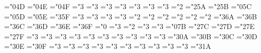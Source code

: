 \mathchardef\vartriangle="0\msx@4D
\mathchardef\blacktriangle="0\msx@4E
\mathchardef\triangledown="0\msx@4F
\mathchardef\eqcirc="3
\mathchardef\lesseqgtr="3
\mathchardef\gtreqless="3
\mathchardef\lesseqqgtr="3
\mathchardef\gtreqqless="3
\mathchardef\Rrightarrow="3
\mathchardef\Lleftarrow="3
\mathchardef\veebar="2
\mathchardef\barwedge="2\msx@5A
\mathchardef\doublebarwedge="2\msx@5B
\mathchardef\angle="0\msx@5C
\mathchardef\measuredangle="0\msx@5D
\mathchardef\sphericalangle="0\msx@5E
\mathchardef\varpropto="3\msx@5F
\mathchardef\smallsmile="3
\mathchardef\smallfrown="3
\mathchardef\Subset="3
\mathchardef\Supset="3
\mathchardef\Cup="2
\let\doublecup=\Cup
\mathchardef\Cap="2
\let\doublecap=\Cap
\mathchardef\curlywedge="2
\mathchardef\curlyvee="2
\mathchardef\leftthreetimes="2
\mathchardef\rightthreetimes="2
\mathchardef\subseteqq="3\msx@6A
\mathchardef\supseteqq="3\msx@6B
\mathchardef\bumpeq="3\msx@6C
\mathchardef\Bumpeq="3\msx@6D
\mathchardef\lll="3\msx@6E
\let\llless=\lll
\mathchardef\ggg="3\msx@6F
\let\gggtr=\ggg
\mathchardef\circledS="0
\mathchardef\pitchfork="3
\mathchardef\dotplus="2
\mathchardef\backsim="3
\mathchardef\backsimeq="3
\mathchardef\complement="0\msx@7B
\mathchardef\intercal="2\msx@7C
\mathchardef\circledcirc="2\msx@7D
\mathchardef\circledast="2\msx@7E
\mathchardef\circleddash="2\msx@7F
\def\ulcorner{\delimiter"4\msx@70\msx@70 }
\def\urcorner{\delimiter"5\msx@71\msx@71 }
\def\llcorner{\delimiter"4\msx@78\msx@78 }
\def\lrcorner{\delimiter"5\msx@79\msx@79 }
\def\yen{\mathhexbox\msx@55 }
\def\checkmark{\mathhexbox\msx@58 }
\def\circledR{\mathhexbox\msx@72 }
\def\maltese{\mathhexbox\msx@7A }
\mathchardef\lvertneqq="3
\mathchardef\gvertneqq="3
\mathchardef\nleq="3
\mathchardef\ngeq="3
\mathchardef\nless="3
\mathchardef\ngtr="3
\mathchardef\nprec="3
\mathchardef\nsucc="3
\mathchardef\lneqq="3
\mathchardef\gneqq="3
\mathchardef\nleqslant="3\msy@0A
\mathchardef\ngeqslant="3\msy@0B
\mathchardef\lneq="3\msy@0C
\mathchardef\gneq="3\msy@0D
\mathchardef\npreceq="3\msy@0E
\mathchardef\nsucceq="3\msy@0F
\mathchardef\precnsim="3
\mathchardef\succnsim="3
\mathchardef\lnsim="3
\mathchardef\gnsim="3
\mathchardef\nleqq="3
\mathchardef\ngeqq="3
\mathchardef\precneqq="3
\mathchardef\succneqq="3
\mathchardef\precnapprox="3
\mathchardef\succnapprox="3
\mathchardef\lnapprox="3\msy@1A
